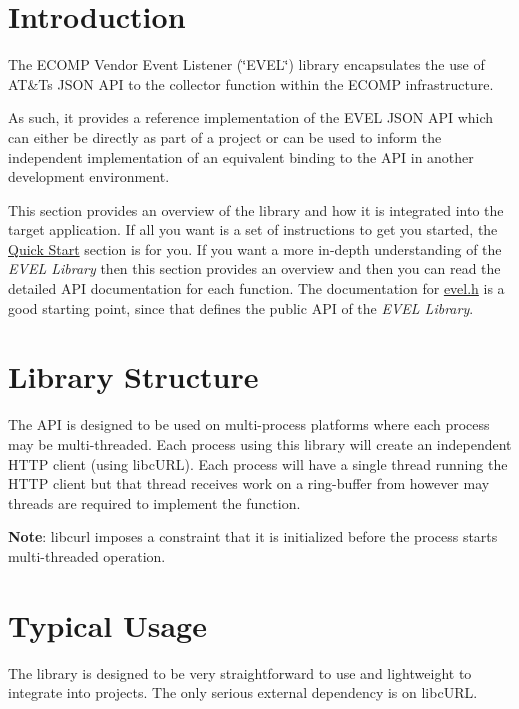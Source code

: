 \section*{Introduction}

The E\+C\+O\+MP Vendor Event Listener (\char`\"{}\+E\+V\+E\+L\char`\"{}) library encapsulates the use of AT\&T\textquotesingle{}s J\+S\+ON A\+PI to the collector function within the E\+C\+O\+MP infrastructure.

As such, it provides a reference implementation of the E\+V\+EL J\+S\+ON A\+PI which can either be directly as part of a project or can be used to inform the independent implementation of an equivalent binding to the A\+PI in another development environment.

This section provides an overview of the library and how it is integrated into the target application. If all you want is a set of instructions to get you started, the \hyperlink{quickstart}{Quick Start} section is for you. If you want a more in-\/depth understanding of the {\itshape E\+V\+EL Library} then this section provides an overview and then you can read the detailed A\+PI documentation for each function. The documentation for \hyperlink{evel_8h}{evel.\+h} is a good starting point, since that defines the public A\+PI of the {\itshape E\+V\+EL Library}.

\section*{Library Structure}

The A\+PI is designed to be used on multi-\/process platforms where each process may be multi-\/threaded. Each process using this library will create an independent H\+T\+TP client (using libc\+U\+RL). Each process will have a single thread running the H\+T\+TP client but that thread receives work on a ring-\/buffer from however may threads are required to implement the function.

{\bfseries Note}\+: libcurl imposes a constraint that it is initialized before the process starts multi-\/threaded operation.

\section*{Typical Usage}

The library is designed to be very straightforward to use and lightweight to integrate into projects. The only serious external dependency is on libc\+U\+RL.

